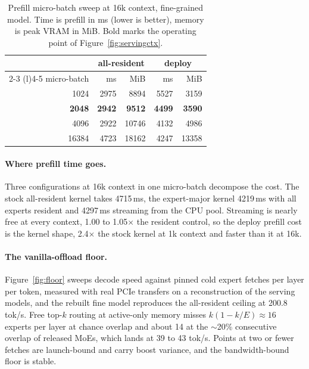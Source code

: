 \documentclass{article}
\begin{document}
\begin{table}[h]
  \centering\small
  \caption{Prefill micro-batch sweep at 16k context, fine-grained model. Time is prefill
  in ms (lower is better), memory is peak VRAM in MiB. Bold marks the operating point of
  Figure~\ref{fig:servingctx}.}
  \label{tab:ubatch}
  \vspace{4pt}
  \begin{tabular}{@{}rrrrr@{}}
    \toprule
    & \multicolumn{2}{c}{all-resident} & \multicolumn{2}{c}{deploy} \\
    \cmidrule(lr){2-3} \cmidrule(l){4-5}
    micro-batch & ms & MiB & ms & MiB \\
    \midrule
    1024  & 2975 & 8894  & 5527 & 3159 \\
    \textbf{2048}  & \textbf{2942} & \textbf{9512}  & \textbf{4499} & \textbf{3590} \\
    4096  & 2922 & 10746 & 4132 & 4986 \\
    16384 & 4723 & 18162 & 4247 & 13358 \\
    \bottomrule
  \end{tabular}
\end{table}

\paragraph{Where prefill time goes.} Three configurations at 16k context in one
micro-batch decompose the cost. The stock all-resident kernel takes 4715\,ms, the
expert-major kernel 4219\,ms with all experts resident and 4297\,ms streaming from the CPU
pool. Streaming is nearly free at every context, 1.00 to 1.05$\times$ the resident
control, so the deploy prefill cost is the kernel shape, 2.4$\times$ the stock kernel at
1k context and faster than it at 16k.

\paragraph{The vanilla-offload floor.} Figure~\ref{fig:floor} sweeps decode speed against
pinned cold expert fetches per layer per token, measured with real PCIe transfers on a
reconstruction of the serving models, and the rebuilt fine model reproduces the
all-resident ceiling at 200.8 tok/s. Free top-$k$ routing at active-only memory misses
$k(1-k/E)\approx16$ experts per layer at chance overlap and about 14 at the $\sim$20\%
consecutive overlap of released MoEs, which lands at 39 to 43 tok/s. Points at two or
fewer fetches are launch-bound and carry boost variance, and the bandwidth-bound floor is
stable.
\end{document}
